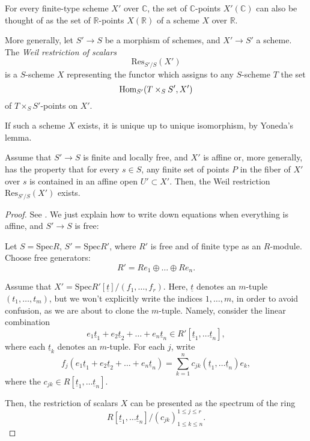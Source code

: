 For every finite-type scheme $X'$ over $\mathbb C$, the set of $\mathbb C$-points $X'(\mathbb C)$ can also be thought of as the set of $\mathbb R$-points $X(\mathbb R)$ of a scheme $X$ over $\mathbb R$. 

More generally, let $S'\to S$ be a morphism of schemes, and $X'\to S'$ a scheme. The \emph{Weil restriction of scalars}
$$ \text{Res}_{S'/S} (X')$$
is a $S$-scheme $X$ representing the functor which assigns to any $S$-scheme $T$ the set
$$ \mathop{\rm Hom}\nolimits_{S'}(T\times_S S', X')$$
of $T\times_S S'$-points on $X'$.

If such a scheme $X$ exists, it is unique up to unique isomorphism, by Yoneda's lemma. 

\begin{theorem}
 \label{theorem-Weil-restriction}
Assume that $S'\to S$ is finite and locally free, and $X'$ is affine or, more generally, has the property that for every $s\in S$, any finite set of points $P$ in the fiber of $X'$ over $s$ is contained in an affine open $U'\subset X'$. Then, the Weil restriction $\text{Res}_{S'/S}(X')$ exists.
\end{theorem}

\begin{proof}
 See \cite[Theorem 7.6.4]{Neron}. We just explain how to write down equations when everything is affine, and $S'\to S$ is free:
 
 Let $S = \text{Spec} R$, $S' = \text{Spec} R'$, where $R'$ is free and of finite type as an $R$-module. Choose free generators:
 $$ R' = R e_1 \oplus \dots \oplus R e_n.$$
 
 Assume that $X' = \text{Spec} R'[\underline{t}]/(f_1, \dots, f_r)$. Here, $\underline{t}$ denotes an $m$-tuple $(t_1, \dots, t_m)$, but we won't explicitly write the indices $1,\dots, m$, in order to avoid confusion, as we are about to clone the $m$-tuple. Namely, consider the linear combination
 $$ e_1 \underline{t}_1 + e_2 \underline{t}_2 +\dots + e_n \underline{t}_n \in R'[\underline{t}_1, \dots \underline{t}_n],$$
 where each $\underline{t}_k$ denotes an $m$-tuple. For each $j$, write 
 $$ f_j (e_1 \underline{t}_1 + e_2 \underline{t}_2 +\dots + e_n \underline{t}_n) = \sum_{k=1}^n c_{jk} (\underline{t}_1, \dots \underline{t}_n) e_k,$$
 where the $c_{jk} \in R[\underline{t}_1, \dots \underline{t}_n]$. 
 
 Then, the restriction of scalars $X$ can be presented as the spectrum of the ring
 $$ R[\underline{t}_1, \dots \underline{t}_n]/(c_{jk})_{1\le k\le n}^{1\le j\le r}.$$
\end{proof}




